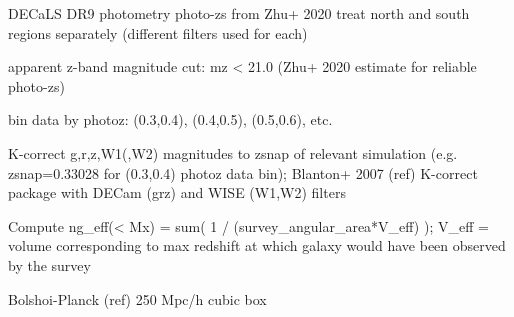 
DECaLS DR9 photometry
photo-zs from Zhu+ 2020
treat north and south regions separately (different filters used for each)

apparent z-band magnitude cut: mz < 21.0 (Zhu+ 2020 estimate for reliable photo-zs)

bin data by photoz: (0.3,0.4), (0.4,0.5), (0.5,0.6), etc.

K-correct g,r,z,W1(,W2) magnitudes to zsnap of relevant simulation (e.g. zsnap=0.33028 for (0.3,0.4) photoz data bin); Blanton+ 2007 (ref) K-correct package with DECam (grz) and WISE (W1,W2) filters



Compute ng_eff(< Mx) = sum( 1 / (survey_angular_area*V_eff) ); V_eff = volume corresponding to max redshift at which galaxy would have been observed by the survey




Bolshoi-Planck (ref)
250 Mpc/h cubic box



